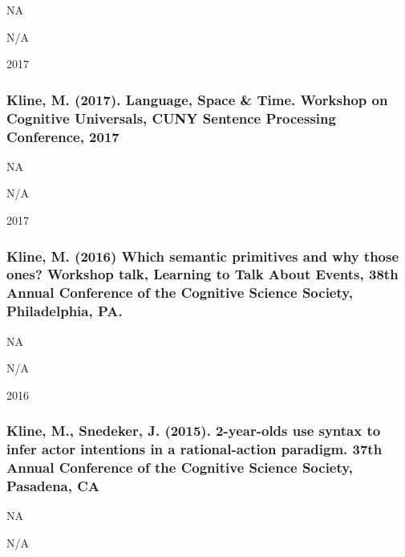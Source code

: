 \documentclass[
]{article}
\begin{document}
NA

N/A

2017

\hypertarget{kline-m.-2017.-language-space-time.-workshop-on-cognitive-universals-cuny-sentence-processing-conference-2017}{%
\subsubsection{Kline, M. (2017). Language, Space \& Time. Workshop on
Cognitive Universals, CUNY Sentence Processing Conference,
2017}\label{kline-m.-2017.-language-space-time.-workshop-on-cognitive-universals-cuny-sentence-processing-conference-2017}}

NA

N/A

2017

\hypertarget{kline-m.-2016-which-semantic-primitives-and-why-those-ones-workshop-talk-learning-to-talk-about-events-38th-annual-conference-of-the-cognitive-science-society-philadelphia-pa.}{%
\subsubsection{Kline, M. (2016) Which semantic primitives and why those
ones? Workshop talk, Learning to Talk About Events, 38th Annual
Conference of the Cognitive Science Society, Philadelphia,
PA.}\label{kline-m.-2016-which-semantic-primitives-and-why-those-ones-workshop-talk-learning-to-talk-about-events-38th-annual-conference-of-the-cognitive-science-society-philadelphia-pa.}}

NA

N/A

2016

\hypertarget{kline-m.-snedeker-j.-2015.-2-year-olds-use-syntax-to-infer-actor-intentions-in-a-rational-action-paradigm.-37th-annual-conference-of-the-cognitive-science-society-pasadena-ca}{%
\subsubsection{Kline, M., Snedeker, J. (2015). 2-year-olds use syntax to
infer actor intentions in a rational-action paradigm. 37th Annual
Conference of the Cognitive Science Society, Pasadena,
CA}\label{kline-m.-snedeker-j.-2015.-2-year-olds-use-syntax-to-infer-actor-intentions-in-a-rational-action-paradigm.-37th-annual-conference-of-the-cognitive-science-society-pasadena-ca}}

NA

N/A
\end{document}
